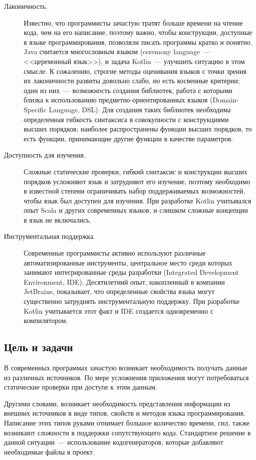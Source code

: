 \begin{description}
	\item[Лаконичность.] Известно, что программисты зачастую тратят больше времени на чтение кода, чем на его написание, поэтому важно, чтобы конструкции, доступные в языке программирования, позволяли писать программы кратко и понятно. Java считается многословным языком (ceremony language~--- <<церемонный язык>>), и задача Kotlin~--- улучшить ситуацию в этом смысле. К сожалению, строгие методы оценивания языков с точки зрения их лаконичности развиты довольно слабо, но есть косвенные критерии; один из них~--- возможность создания библиотек, работа с которыми близка к использованию предметно-ориентированных языков (Domain-Specific Language, DSL). Для создания таких библиотек необходима определенная гибкость синтаксиса в совокупности с конструкциями высших порядков; наиболее распространены функции высших порядков, то есть функции, принимающие другие функции в качестве параметров.
	\item[Доступность для изучения.] Сложные статические проверки, гибкий синтаксис и конструкции высших порядков усложняют язык и затрудняют его изучение, поэтому необходимо в известной степени ограничивать набор поддерживаемых возможностей, чтобы язык был доступен для изучения. При разработке Kotlin учитывался опыт Scala и других современных языков, и слишком сложные концепции в язык не включались.
	\item[Инструментальная поддержка.] Современные программисты активно используют различные автоматизированные инструменты, центральное место среди которых занимают интегрированные среды разработки (Integrated Development Environment, IDE). Десятилетний опыт, накопленный в компании JetBrains, показывает, что определенные свойства языка могут существенно затруднять инструментальную поддержку. При разработке Kotlin учитывается этот факт и IDE создается одновременно с компилятором.
\end{description}

\subsection{Цель и задачи}

В современных программах зачастую возникает необходимость получать данные из различных источников.
По мере усложнения приложения могут потребоваться статические проверки при доступе к этим данным.

Другими словами, возникает необходимость представления информации из внешних источников в виде типов, свойств и методов языка программирования.
Написание этих типов руками отнимает большое количество времени, сил, также возникают сложности в поддержки сопутствующего кода.
Стандартное решение в данной ситуации~--- использование кодогенераторов, которые добавляют необходимые файлы в проект.

